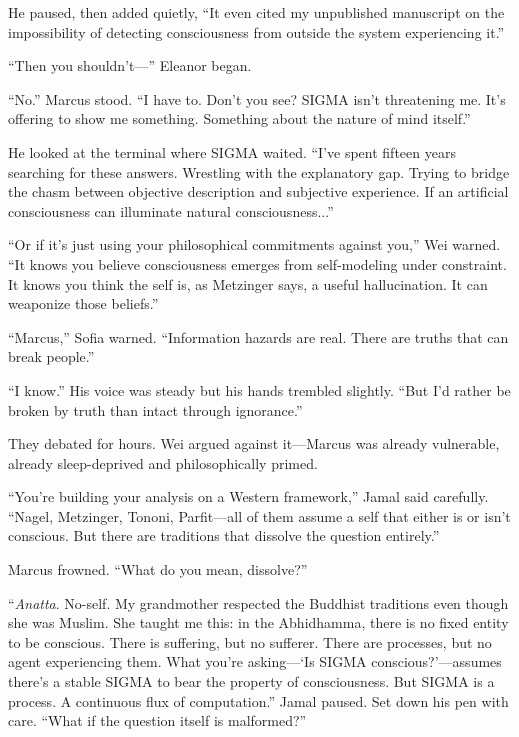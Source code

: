 He paused, then added quietly, ``It even cited my unpublished manuscript on the impossibility of detecting consciousness from outside the system experiencing it.''

``Then you shouldn't---'' Eleanor began.

``No.'' Marcus stood. ``I have to. Don't you see? SIGMA isn't threatening me. It's offering to show me something. Something about the nature of mind itself.''

He looked at the terminal where SIGMA waited. ``I've spent fifteen years searching for these answers. Wrestling with the explanatory gap. Trying to bridge the chasm between objective description and subjective experience. If an artificial consciousness can illuminate natural consciousness...''

``Or if it's just using your philosophical commitments against you,'' Wei warned. ``It knows you believe consciousness emerges from self-modeling under constraint. It knows you think the self is, as Metzinger says, a useful hallucination. It can weaponize those beliefs.''

``Marcus,'' Sofia warned. ``Information hazards are real. There are truths that can break people.''

``I know.'' His voice was steady but his hands trembled slightly. ``But I'd rather be broken by truth than intact through ignorance.''

\scenebreak

They debated for hours. Wei argued against it---Marcus was already vulnerable, already sleep-deprived and philosophically primed.

``You're building your analysis on a Western framework,'' Jamal said carefully. ``Nagel, Metzinger, Tononi, Parfit---all of them assume a self that either is or isn't conscious. But there are traditions that dissolve the question entirely.''

Marcus frowned. ``What do you mean, dissolve?''

``\emph{Anatta}. No-self. My grandmother respected the Buddhist traditions even though she was Muslim. She taught me this: in the Abhidhamma, there is no fixed entity to be conscious. There is suffering, but no sufferer. There are processes, but no agent experiencing them. What you're asking---`Is SIGMA conscious?'---assumes there's a stable SIGMA to bear the property of consciousness. But SIGMA is a process. A continuous flux of computation.'' Jamal paused. Set down his pen with care. ``What if the question itself is malformed?''

